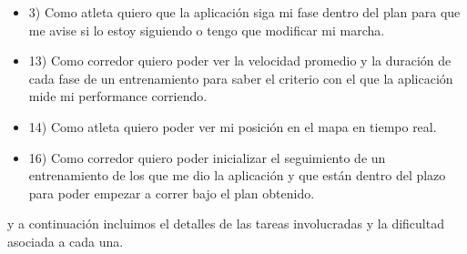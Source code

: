 \documentclass[10pt, a4paper,english,spanish]{article}
\begin{document}
\begin{itemize}
	\item 3) Como atleta quiero que la aplicación siga mi fase dentro del plan para que me avise si lo estoy siguiendo o tengo que modificar mi marcha.
	\item 13) Como corredor quiero poder ver la velocidad promedio y la duración de cada fase de un entrenamiento para saber el criterio con el que la aplicación mide mi performance corriendo.
	\item 14) Como atleta quiero poder ver mi posición en el mapa en tiempo real.	\item 16) Como corredor quiero poder inicializar el seguimiento de un entrenamiento de los que me dio la aplicación y que están dentro del plazo para poder empezar a correr bajo el plan obtenido.	
\end{itemize}

y a continuaci\'on incluimos el detalles de las tareas involucradas y la dificultad asociada a cada una.
\end{document}
